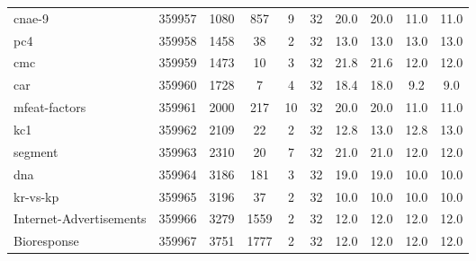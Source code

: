 \documentclass[11pt]{article}
\begin{document}
\begin{table}[H]
{\begin{tabular}{@{}lccccc|cc|cc@{}}
cnae-9                                      & 359957         & 1080        & 857        & 9         & 32          & 20.0                     & 20.0          & 11.0                        & 11.0              \\
pc4                                         & 359958         & 1458        & 38         & 2         & 32          & 13.0                     & 13.0          & 13.0                        & 13.0              \\
cmc                                         & 359959         & 1473        & 10         & 3         & 32          & 21.8                     & 21.6          & 12.0                        & 12.0              \\
car                                         & 359960         & 1728        & 7          & 4         & 32          & 18.4                     & 18.0          & 9.2                         & 9.0               \\
mfeat-factors                               & 359961         & 2000        & 217        & 10        & 32          & 20.0                     & 20.0          & 11.0                        & 11.0              \\
kc1                                         & 359962         & 2109        & 22         & 2         & 32          & 12.8                     & 13.0          & 12.8                        & 13.0              \\
segment                                     & 359963         & 2310        & 20         & 7         & 32          & 21.0                     & 21.0          & 12.0                        & 12.0              \\
dna                                         & 359964         & 3186        & 181        & 3         & 32          & 19.0                     & 19.0          & 10.0                        & 10.0              \\
kr-vs-kp                                    & 359965         & 3196        & 37         & 2         & 32          & 10.0                     & 10.0          & 10.0                        & 10.0              \\
Internet-Advertisements                     & 359966         & 3279        & 1559       & 2         & 32          & 12.0                     & 12.0          & 12.0                        & 12.0              \\
Bioresponse                                 & 359967         & 3751        & 1777       & 2         & 32          & 12.0                     & 12.0          & 12.0                        & 12.0              \\

\end{tabular}}
\end{table}
\end{document}
